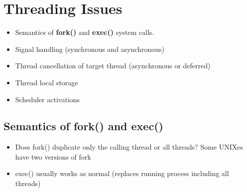 \documentclass[oneside]{book}
\begin{document}
        \section{Threading Issues}
            \begin{itemize}
                \item Semantics of \textbf{fork()} and \textbf{exec()} system calls.
                \item Signal handling (synchronous and asynchronous)
                \item Thread cancellation of target thread (asynchronous or deferred)
                \item Thread local storage
                \item Scheduler activations
            \end{itemize}
            \subsection{Semantics of fork() and exec()}
                \begin{itemize}
                    \item Does fork() duplicate only the calling thread or all threads?
                        \subitem Some UNIXes have two versions of fork
                    \item exec() usually works as normal (replaces running process including all threads)
                \end{itemize}
\end{document}

